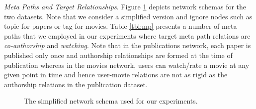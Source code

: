 \textit{Meta Paths and Target Relationships}. Figure \ref{Fig:expSchema} depicts network schemas for the two datasets. Note that we consider a simplified version and ignore nodes such as topic for papers or tag for movies. Table \ref{tbl:mp} presents a number of meta paths that we employed in our experiments where target meta path relations are \textit{co-authorship} and \textit{watching}. Note that in the publications network, each paper is published only once and authorship relationships are formed at the time of publication whereas in the movies network, users can watch/rate a movie at any given point in time and hence user-movie relations are not as rigid as the authorship relations in the publication dataset.



\begin{figure}[t]
\centering
{}
\caption{The simplified network schema used for our experiments.} \label{Fig:expSchema}
\end{figure}


